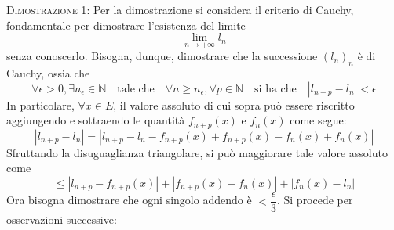 \documentclass[a4paper]{extarticle}
\begin{document}
\vspace{2em}
\noindent
\normalfont \normalsize
\textsc{Dimostrazione 1}: Per la dimostrazione si considera il criterio di Cauchy, fondamentale per dimostrare l'esistenza del limite
\[\lim_{n \to +\infty} l_n\]
senza conoscerlo. Bisogna, dunque, dimostrare che la successione $(l_n)_n$ è di Cauchy, ossia che
\[\forall \epsilon > 0, \exists n_\epsilon \in \mathbb{N} \hspace{1em} \text{tale che} \hspace{1em} \forall n \geq n_\epsilon, \forall p \in \mathbb{N} \hspace{1em} \text{si ha che} \hspace{1em} \left \vert l_{n+p} - l_n \right \vert < \epsilon\]
In particolare, $\forall x \in E$, il valore assoluto di cui sopra può essere riscritto aggiungendo e sottraendo le quantità $f_{n+p}(x)$ e $f_n(x)$ come segue:
\[\left \vert l_{n+p} - l_n\right \vert = \left \vert l_{n+p} - l_n - f_{n+p}(x) + f_{n+p}(x) - f_n(x) + f_n(x)\right \vert\]
Sfruttando la disuguaglianza triangolare, si può maggiorare tale valore assoluto come
\[\leq \left \vert l_{n+p} - f_{n+p}(x)\right \vert + \left \vert f_{n+p}(x) - f_n(x) \right \vert + \left \vert f_n(x) - l_n\right \vert\]
Ora bisogna dimostrare che ogni singolo addendo è $< \dfrac{\epsilon}{3}$. Si procede per osservazioni successive:
\end{document}
